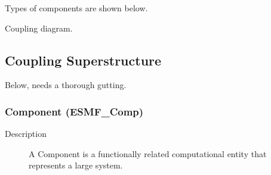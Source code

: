 Types of components are shown below.


Coupling diagram.


\subsection{Coupling Superstructure}

Below, needs a thorough gutting.

\subsubsection{Component (ESMF\_Comp)} 
\begin{description}
\item [Description] A Component is a functionally related computational entity that represents 
a large system.  
\end{description}

